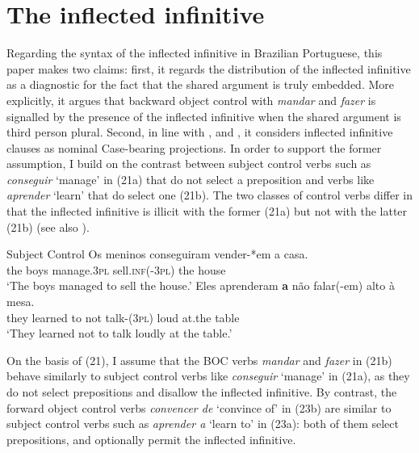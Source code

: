 \documentclass[output=paper]{langsci/langscibook}
\begin{document}
\section{The inflected infinitive}%

Regarding the syntax of the inflected infinitive in Brazilian Portuguese, this paper makes two claims: first, it regards the distribution of the inflected infinitive as a diagnostic for the fact that the shared argument is truly embedded. More explicitly, it argues that backward object control with \textit{mandar} and \textit{fazer} is signalled by the presence of the inflected infinitive when the shared argument is third person plural. Second, in line with \citet{Raposo1987}, \citet{Nunes1995} and \citet{Pires2007}, it considers inflected infinitive clauses as nominal Case-bearing projections. In order to support the former assumption, I build on the contrast between subject control verbs such as \textit{conseguir} ‘manage’ in (21a) that do not select a preposition and verbs like \textit{aprender} ‘learn’ that do select one (21b). The two classes of control verbs differ in that the inflected infinitive is illicit with the former (21a) but not with the latter (21b) (see also \citealt{Modesto2010}). 

\ea%
         Subject Control\label{ex:moreno:21}
    \ea  
    \gll Os meninos conseguiram   vender-*em   a casa.  \\
         the boys      manage.\textsc{3pl}    sell\textsc{.inf(-3pl)}  the house\\
    \glt ‘The boys managed to sell the house.’
    \ex  
    \gll Eles    aprenderam \textbf{a}  não   falar(-em)     alto  à        mesa.     \\
         they    learned        to not    talk-(\textsc{3pl})  loud at.the table  \\
    \glt ‘They learned not to talk loudly at the table.’
    \z
\z

On the basis of (21), I assume that the BOC verbs \textit{mandar} and \textit{fazer} in (21b) behave similarly to subject control verbs like \textit{conseguir} ‘manage’ in (21a), as they do not select prepositions and disallow the inflected infinitive. By contrast, the forward object control verbs \textit{convencer de} ‘convince of’ in (23b) are similar to subject control verbs such as \textit{aprender a} ‘learn to’ in (23a): both of them select prepositions, and optionally permit the inflected infinitive.
\end{document}
